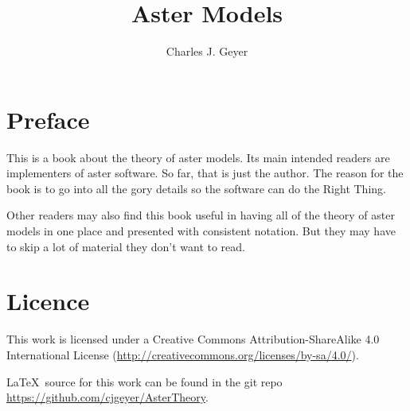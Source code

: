 \documentclass[11pt,oneside]{book}
\begin{document}
\title{Aster Models}

\author{Charles J. Geyer}

\maketitle

\frontmatter

\chapter{Preface}

This is a book about the theory of aster models.  Its main intended
readers are implementers of aster software.  So far, that is just the
author.  The reason for the book is to go into all the gory details
so the software can do the Right Thing.

Other readers may also find this book useful in having all of the theory
of aster models in one place and presented with consistent notation.
But they may have to skip a lot of material they don't want to read.

\chapter{Licence}

This work is licensed under a Creative Commons Attribution-ShareAlike 4.0
International License (\url{http://creativecommons.org/licenses/by-sa/4.0/}).

\LaTeX\ source for this work can be found in the git repo
\url{https://github.com/cjgeyer/AsterTheory}.

\tableofcontents

\mainmatter





\printindex
\end{document}
